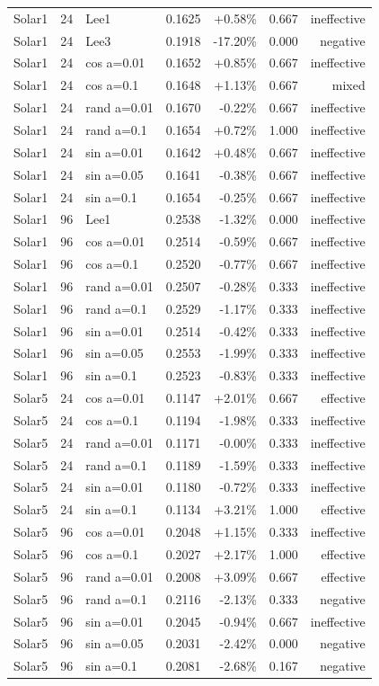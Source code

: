 \begin{table}[t]
\begin{tabular}{lrlrrrr}
Solar1 & 24 & Lee1 & 0.1625 & +0.58\% & 0.667 & ineffective \\
Solar1 & 24 & Lee3 & 0.1918 & -17.20\% & 0.000 & negative \\
Solar1 & 24 & cos a=0.01 & 0.1652 & +0.85\% & 0.667 & ineffective \\
Solar1 & 24 & cos a=0.1 & 0.1648 & +1.13\% & 0.667 & mixed \\
Solar1 & 24 & rand a=0.01 & 0.1670 & -0.22\% & 0.667 & ineffective \\
Solar1 & 24 & rand a=0.1 & 0.1654 & +0.72\% & 1.000 & ineffective \\
Solar1 & 24 & sin a=0.01 & 0.1642 & +0.48\% & 0.667 & ineffective \\
Solar1 & 24 & sin a=0.05 & 0.1641 & -0.38\% & 0.667 & ineffective \\
Solar1 & 24 & sin a=0.1 & 0.1654 & -0.25\% & 0.667 & ineffective \\
Solar1 & 96 & Lee1 & 0.2538 & -1.32\% & 0.000 & ineffective \\
Solar1 & 96 & cos a=0.01 & 0.2514 & -0.59\% & 0.667 & ineffective \\
Solar1 & 96 & cos a=0.1 & 0.2520 & -0.77\% & 0.667 & ineffective \\
Solar1 & 96 & rand a=0.01 & 0.2507 & -0.28\% & 0.333 & ineffective \\
Solar1 & 96 & rand a=0.1 & 0.2529 & -1.17\% & 0.333 & ineffective \\
Solar1 & 96 & sin a=0.01 & 0.2514 & -0.42\% & 0.333 & ineffective \\
Solar1 & 96 & sin a=0.05 & 0.2553 & -1.99\% & 0.333 & ineffective \\
Solar1 & 96 & sin a=0.1 & 0.2523 & -0.83\% & 0.333 & ineffective \\
Solar5 & 24 & cos a=0.01 & 0.1147 & +2.01\% & 0.667 & effective \\
Solar5 & 24 & cos a=0.1 & 0.1194 & -1.98\% & 0.333 & ineffective \\
Solar5 & 24 & rand a=0.01 & 0.1171 & -0.00\% & 0.333 & ineffective \\
Solar5 & 24 & rand a=0.1 & 0.1189 & -1.59\% & 0.333 & ineffective \\
Solar5 & 24 & sin a=0.01 & 0.1180 & -0.72\% & 0.333 & ineffective \\
Solar5 & 24 & sin a=0.1 & 0.1134 & +3.21\% & 1.000 & effective \\
Solar5 & 96 & cos a=0.01 & 0.2048 & +1.15\% & 0.333 & ineffective \\
Solar5 & 96 & cos a=0.1 & 0.2027 & +2.17\% & 1.000 & effective \\
Solar5 & 96 & rand a=0.01 & 0.2008 & +3.09\% & 0.667 & effective \\
Solar5 & 96 & rand a=0.1 & 0.2116 & -2.13\% & 0.333 & negative \\
Solar5 & 96 & sin a=0.01 & 0.2045 & -0.94\% & 0.667 & ineffective \\
Solar5 & 96 & sin a=0.05 & 0.2031 & -2.42\% & 0.000 & negative \\
Solar5 & 96 & sin a=0.1 & 0.2081 & -2.68\% & 0.167 & negative \\
\bottomrule
\end{tabular}
\end{table}
